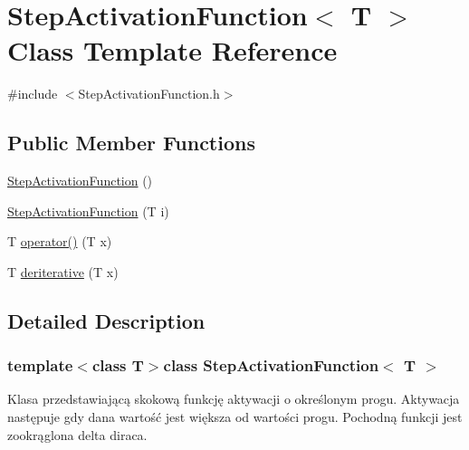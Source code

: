\hypertarget{class_step_activation_function}{\section{\-Step\-Activation\-Function$<$ \-T $>$ \-Class \-Template \-Reference}
\label{class_step_activation_function}
}


{\ttfamily \#include $<$\-Step\-Activation\-Function.\-h$>$}

\subsection*{\-Public \-Member \-Functions}
\begin{DoxyCompactItemize}
\item 
\hyperlink{class_step_activation_function_abcd92f0d83e917f9e7bc57caadf8af45}{\-Step\-Activation\-Function} ()
\item 
\hyperlink{class_step_activation_function_ac28ff4d93eb28f878b174630d4023c67}{\-Step\-Activation\-Function} (\-T i)
\item 
\-T \hyperlink{class_step_activation_function_a2b243dae27dd2ba5458acc5a32d4c542}{operator()} (\-T x)
\item 
\-T \hyperlink{class_step_activation_function_ad85d33127de89670f9c8a46ec1d5dd55}{deriterative} (\-T x)
\end{DoxyCompactItemize}


\subsection{\-Detailed \-Description}
\subsubsection*{template$<$class T$>$class Step\-Activation\-Function$<$ T $>$}

\-Klasa przedstawiającą skokową funkcję aktywacji o określonym progu. \-Aktywacja następuje gdy dana wartość jest większa od wartości progu. \-Pochodną funkcji jest zookrąglona delta diraca. 

